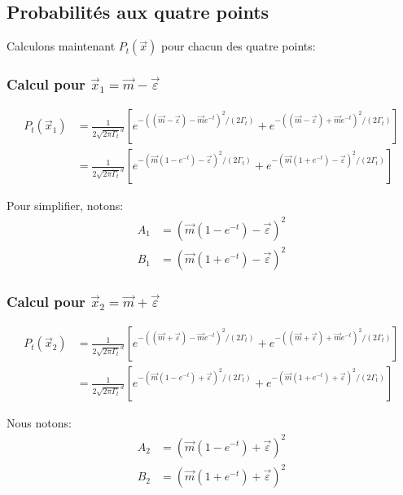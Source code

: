 \documentclass[11pt,a4paper]{article}
\begin{document}
\subsection{Probabilités aux quatre points}

Calculons maintenant $P_t(\vec{x})$ pour chacun des quatre points:

\subsubsection{Calcul pour $\vec{x}_1 = \vec{m} - \vec{\varepsilon}$}

\begin{align}
P_t(\vec{x}_1) &= \frac{1}{2\sqrt{2\pi\Gamma_t}^d}\left[
e^{-((\vec{m}-\vec{\varepsilon})-\vec{m} e^{-t})^2/(2 \Gamma_t)}
+e^{-((\vec{m}-\vec{\varepsilon})+\vec{m} e^{-t})^2/(2 \Gamma_t)}
\right] \\
&= \frac{1}{2\sqrt{2\pi\Gamma_t}^d}\left[
e^{-(\vec{m}(1-e^{-t})-\vec{\varepsilon})^2/(2 \Gamma_t)}
+e^{-(\vec{m}(1+e^{-t})-\vec{\varepsilon})^2/(2 \Gamma_t)}
\right]
\end{align}

Pour simplifier, notons:
\begin{align}
A_1 &= (\vec{m}(1-e^{-t})-\vec{\varepsilon})^2 \\
B_1 &= (\vec{m}(1+e^{-t})-\vec{\varepsilon})^2
\end{align}

\subsubsection{Calcul pour $\vec{x}_2 = \vec{m} + \vec{\varepsilon}$}

\begin{align}
P_t(\vec{x}_2) &= \frac{1}{2\sqrt{2\pi\Gamma_t}^d}\left[
e^{-((\vec{m}+\vec{\varepsilon})-\vec{m} e^{-t})^2/(2 \Gamma_t)}
+e^{-((\vec{m}+\vec{\varepsilon})+\vec{m} e^{-t})^2/(2 \Gamma_t)}
\right] \\
&= \frac{1}{2\sqrt{2\pi\Gamma_t}^d}\left[
e^{-(\vec{m}(1-e^{-t})+\vec{\varepsilon})^2/(2 \Gamma_t)}
+e^{-(\vec{m}(1+e^{-t})+\vec{\varepsilon})^2/(2 \Gamma_t)}
\right]
\end{align}

Nous notons:
\begin{align}
A_2 &= (\vec{m}(1-e^{-t})+\vec{\varepsilon})^2 \\
B_2 &= (\vec{m}(1+e^{-t})+\vec{\varepsilon})^2
\end{align}
\end{document}
